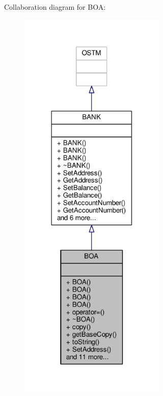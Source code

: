 Collaboration diagram for B\+OA\+:
\nopagebreak
\begin{figure}[H]
\begin{center}
\leavevmode
\includegraphics[width=198pt]{class_b_o_a__coll__graph}
\end{center}
\end{figure}
